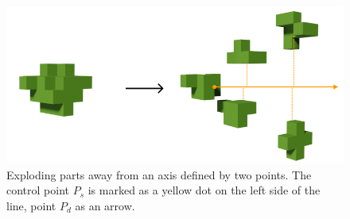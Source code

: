 \begin{figure}[h]
	\centering
	\includegraphics[width=.65\linewidth]{fig/Images/LineExplosion}
	\caption[]{Exploding parts away from an axis defined by two points. The control point $P_s$ is marked as a yellow dot on the left side of the line, point $P_d$ as an arrow.}
	\label{fig:lineExpl1}
\end{figure}


